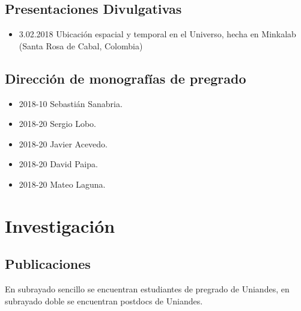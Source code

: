\documentclass{article}
\begin{document}
\subsection{Presentaciones Divulgativas}

\begin{itemize}
\item{3.02.2018} 
Ubicaci\'on espacial y temporal en el Universo, hecha en Minkalab
(Santa Rosa de Cabal, Colombia)
\end{itemize}


\subsection{Direcci\'on de monograf\'ias de pregrado}

\begin{itemize}
\item {2018-10} Sebasti\'an Sanabria.
\item {2018-20} Sergio Lobo.
\item {2018-20} Javier Acevedo.
\item {2018-20} David Paipa.
\item {2018-20} Mateo Laguna.
\end{itemize}

\section{Investigaci\'on}

\subsection{Publicaciones}

En subrayado sencillo se encuentran estudiantes de pregrado de
Uniandes, en subrayado doble se encuentran postdocs de Uniandes.
\end{document}
